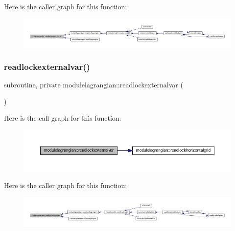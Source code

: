 Here is the caller graph for this function\+:\nopagebreak
\begin{figure}[H]
\begin{center}
\leavevmode
\includegraphics[width=350pt]{namespacemodulelagrangian_a3d2b3737568ce2b7e2998cbd2192c685_icgraph}
\end{center}
\end{figure}
\mbox{\label{namespacemodulelagrangian_a1be97a0d8bb95c907adf6f985c3a70ce}} 
\subsubsection{\texorpdfstring{readlockexternalvar()}{readlockexternalvar()}}
{\footnotesize\ttfamily subroutine, private modulelagrangian\+::readlockexternalvar (\begin{DoxyParamCaption}{ }\end{DoxyParamCaption})\hspace{0.3cm}{\ttfamily [private]}}

Here is the call graph for this function\+:\nopagebreak
\begin{figure}[H]
\begin{center}
\leavevmode
\includegraphics[width=350pt]{namespacemodulelagrangian_a1be97a0d8bb95c907adf6f985c3a70ce_cgraph}
\end{center}
\end{figure}
Here is the caller graph for this function\+:\nopagebreak
\begin{figure}[H]
\begin{center}
\leavevmode
\includegraphics[width=350pt]{namespacemodulelagrangian_a1be97a0d8bb95c907adf6f985c3a70ce_icgraph}
\end{center}
\end{figure}
\mbox{\label{namespacemodulelagrangian_a94ace2d6de2898ec24d8cd3f4ccd1292}} 
